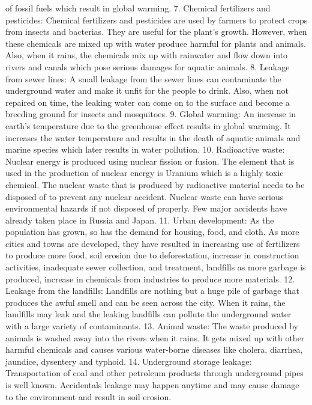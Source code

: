 of fossil fuels which result in global warming.
7. Chemical fertilizers and pesticides: Chemical fertilizers and
pesticides are used by farmers to protect crops from insects and
bacterias. They are useful for the plant’s growth. However, when
these chemicals are mixed up with water produce harmful for plants
and animals. Also, when it rains, the chemicals mix up with rainwater
and flow down into rivers and canals which pose serious damages for
aquatic animals.
8. Leakage from sewer lines: A small leakage from the sewer lines
can contaminate the underground water and make it unfit for the
people to drink. Also, when not repaired on time, the leaking water
can come on to the surface and become a breeding ground for
insects and mosquitoes.
9. Global warming: An increase in earth’s temperature due to the
greenhouse effect results in global warming. It increases the water
temperature and results in the death of aquatic animals and marine
species which later results in water pollution.
10. Radioactive waste: Nuclear energy is produced using nuclear
fission or fusion. The element that is used in the production of
nuclear energy is Uranium which is a highly toxic chemical. The
nuclear waste that is produced by radioactive material needs to be
disposed of to prevent any nuclear accident. Nuclear waste can have
serious environmental hazards if not disposed of properly. Few
major accidents have already taken place in Russia and Japan.
11. Urban development: As the population has grown, so has the
demand for housing, food, and cloth. As more cities and towns are
developed, they have resulted in increasing use of fertilizers to
produce more food, soil erosion due to deforestation, increase in
construction activities, inadequate sewer collection, and treatment,
landfills as more garbage is produced, increase in chemicals from
industries to produce more materials.
12. Leakage from the landfills: Landfills are nothing but a huge pile
of garbage that produces the awful smell and can be seen across the
city. When it rains, the landfills may leak and the leaking landfills
can pollute the underground water with a large variety of
contaminants.
13. Animal waste: The waste produced by animals is washed away into
the rivers when it rains. It gets mixed up with other harmful
chemicals and causes various water-borne diseases like cholera,
diarrhea, jaundice, dysentery and typhoid.
14. Underground storage leakage: Transportation of coal and other
petroleum products through underground pipes is well known.
Accidentals leakage may happen anytime and may cause damage to
the environment and result in soil erosion.
